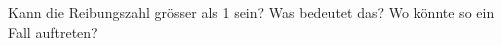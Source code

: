 %
\begin{aufgabe}
	Kann die Reibungszahl grösser als 1 sein?%
	Was bedeutet das?
	Wo könnte so ein Fall auftreten?%
\end{aufgabe}
\begin{loesung}

\end{loesung}

